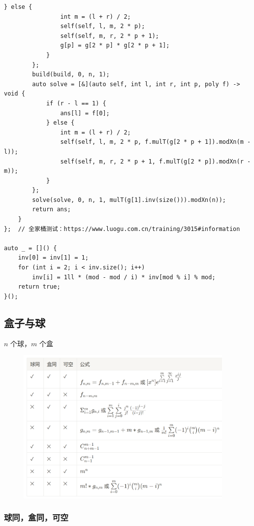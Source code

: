 \documentclass[UTF8]{ctexart}
\begin{document}
\begin{sloppypar}
\begin{lstlisting}[style=cpp]
            } else {
                int m = (l + r) / 2;
                self(self, l, m, 2 * p);
                self(self, m, r, 2 * p + 1);
                g[p] = g[2 * p] * g[2 * p + 1];
            }
        };
        build(build, 0, n, 1);
        auto solve = [&](auto self, int l, int r, int p, poly f) -> void {
            if (r - l == 1) {
                ans[l] = f[0];
            } else {
                int m = (l + r) / 2;
                self(self, l, m, 2 * p, f.mulT(g[2 * p + 1]).modXn(m - l));
                self(self, m, r, 2 * p + 1, f.mulT(g[2 * p]).modXn(r - m));
            }
        };
        solve(solve, 0, n, 1, mulT(g[1].inv(size())).modXn(n));
        return ans;
    }
};  // 全家桶测试：https://www.luogu.com.cn/training/3015#information

auto _ = []() {
    inv[0] = inv[1] = 1;
    for (int i = 2; i < inv.size(); i++)
        inv[i] = 1ll * (mod - mod / i) * inv[mod % i] % mod;
    return true;
}();
\end{lstlisting}
\subsection{盒子与球}

$n$ 个球，$m$ 个盒

\begin{figure}[H]
    \flushleft
    \includegraphics[width=0.95\textwidth]{box-and-ball.png}
    \label{fig:left}
\end{figure}

\subsubsection{球同，盒同，可空}


\end{sloppypar}
\end{document}
